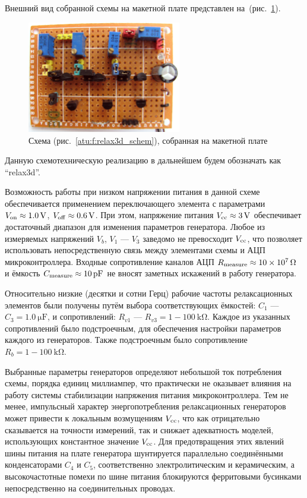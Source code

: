 Внешний вид собранной схемы на макетной плате представлен на~(рис.~\ref{atu:f:relax3d_board}).

\begin{figure}[htb!]
  \centerline{\includegraphics[width=0.6\textwidth]{p/relax3d_board.jpg} }
  \caption{Схема (рис.~\ref{atu:f:relax3d_schem}), собранная на макетной плате}
  \label{atu:f:relax3d_board}
\end{figure}

Данную схемотехническую реализацию в дальнейшем будем обозначать как ``relax3d''.

Возможность работы при низком напряжении питания в данной схеме обеспечивается
применением переключающего элемента с параметрами
$V_\mathrm{on} \approx \SI{1.0}{\volt}$,
$V_\mathrm{off} \approx \SI{0.6}{\volt}$.
При этом, напряжение питания $V_\mathrm{cc} \approx \SI{3}{\volt}$
обеспечивает достаточный диапазон для изменения параметров генератора.
Любое из измеряемых напряжений $V_b$, $V_1$ --- $V_3$
заведомо не превосходит $V_\mathrm{cc}$,
что позволяет использовать непосредственную связь
между элементами схемы и АЦП микроконтроллера.
Входные сопротивление каналов АЦП $R_\mathrm{measure} \approx \SI{10e7}{\ohm}$
и ёмкость $C\Tidx{measure} \approx \SI{10}{\pico\farad} $
не вносят заметных искажений в работу генератора.

Относительно низкие (десятки и сотни Герц) рабочие частоты
релаксационных элементов были получены путём выбора соответствующих
ёмкостей:
$C_1$ --- $C_3 = \SI{1.0}{\micro\farad}$,
и сопротивлений:
$R_{v1}$ --- $R_{v3} = 1-\SI{100}{\kilo\ohm}$.
Каждое из указанных сопротивлений было подстроечным, для обеспечения
настройки параметров каждого из генераторов. Также подстроечным было сопротивление
$ R_{b} = 1-\SI{100}{\kilo\ohm}$.

Выбранные параметры генераторов определяют небольшой ток
потребления схемы, порядка единиц миллиампер, что
практически не оказывает влияния на работу
системы стабилизации напряжения питания микроконтроллера.
Тем не менее, импульсный характер энергопотребления
релаксационных генераторов может привести
к локальным возмущениям $V_\mathrm{cc}$, что
как отрицательно сказывается на точности измерений,
так и снижает адекватность моделей, использующих
константное значение $V_\mathrm{cc}$.
Для предотвращения этих явлений шины питания на плате генератора
шунтируется параллельно соединёнными конденсаторами $C_4$ и $C_5$,
соответственно электролитическим и керамическим,
а высокочастотные помехи по шине питания блокируются
ферритовыми бусинками непосредственно на соединительных проводах.

